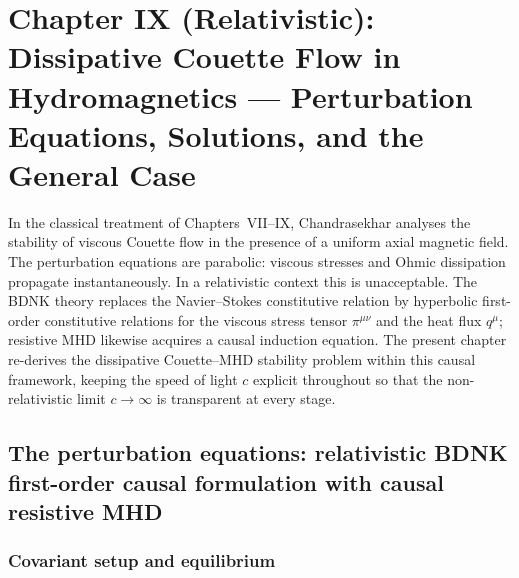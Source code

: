 %

\chapter*{Chapter IX (Relativistic): Dissipative Couette Flow in
  Hydromagnetics --- Perturbation Equations, Solutions, and the
  General Case}

In the classical treatment of Chapters~VII--IX, Chandrasekhar analyses
the stability of viscous Couette flow in the presence of a uniform axial
magnetic field.  The perturbation equations are parabolic: viscous
stresses and Ohmic dissipation propagate instantaneously.  In a
relativistic context this is unacceptable.  The BDNK theory
replaces the Navier--Stokes constitutive relation by hyperbolic
first-order constitutive relations for the viscous stress tensor $\pi^{\mu\nu}$
and the heat flux $q^{\mu}$; resistive MHD likewise acquires a causal
induction equation.  The present chapter re-derives the dissipative
Couette--MHD stability problem within this causal framework, keeping the
speed of light $c$ explicit throughout so that the non-relativistic limit
$c\to\infty$ is transparent at every stage.

\section{The perturbation equations: relativistic BDNK first-order causal
  formulation with causal resistive MHD}
\label{sec:rel-87}

\subsection{Covariant setup and equilibrium}
\label{sec:rel-87-setup}

